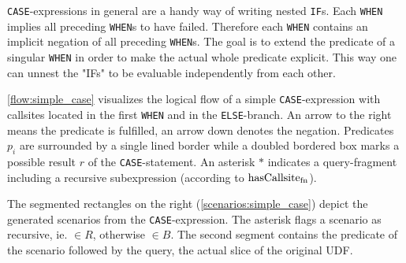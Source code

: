 \texttt{CASE}-expressions in general are a handy way of writing nested \texttt{IF}s. Each \texttt{WHEN} implies all preceding \texttt{WHEN}s to have failed. Therefore each \texttt{WHEN} contains an implicit negation of all preceding \texttt{WHEN}s. The goal is to extend the predicate of a singular \texttt{WHEN} in order to make the actual whole predicate explicit. This way one can unnest the "IFs" to be evaluable independently from each other.

\autoref{flow:simple_case} visualizes the logical flow of a simple \texttt{CASE}-expression with callsites located in the first \texttt{WHEN} and in the \texttt{ELSE}-branch. An arrow to the right means the predicate is fulfilled, an arrow down denotes the negation. Predicates $p_i$ are surrounded by a single lined border while a doubled bordered box marks a possible result $r$ of the \texttt{CASE}-statement. An asterisk $\ast$ indicates a query-fragment including a recursive subexpression (according to $\operatorname{\text{hasCallsite}_{fn}}$).

The segmented rectangles on the right (\autoref{scenarios:simple_case}) depict the generated scenarios from the \texttt{CASE}-expression. The asterisk flags a scenario as recursive, ie. $\in R$, otherwise $\in B$. The second segment contains the predicate of the scenario followed by the query, the actual slice of the original UDF.

